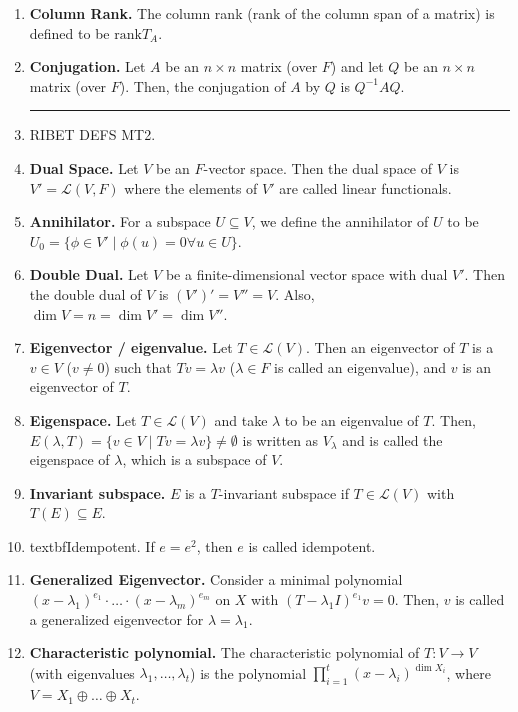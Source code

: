 \begin{enumerate}
	\item \textbf{Column Rank. } The column rank (rank of the column span of a matrix) is defined to be $\textrm{rank}T_A$. 
	\item \textbf{Conjugation. } Let $A$ be an $n \times n$ matrix (over $F$) and let $Q$ be an $n \times n$ matrix (over $F$). Then, the conjugation of $A$ by $Q$ is $Q^{-1}AQ$.
	\begin{center}
		\hrule
	\end{center}
	\item RIBET DEFS MT2.
	\item \textbf{Dual Space. } Let $V$ be an $F$-vector space. Then the dual space of $V$ is $V' = \mathscr{L}(V,F)$ where the elements of $V'$ are called linear functionals. 
	\item \textbf{Annihilator. } For a subspace $U \subseteq V$, we define the annihilator of $U$ to be $U_0 = \{\phi \in V' \mid \phi(u) = 0 \forall u \in U\}$. 
	\item \textbf{Double Dual. } Let $V$ be a finite-dimensional vector space with dual $V'$. Then the double dual of $V$ is $(V')' = V'' = V$. Also, $\dim V = n = \dim V' = \dim V''$. 
	\item \textbf{Eigenvector / eigenvalue. } Let $T \in \mathscr{L}(V)$. Then an eigenvector of $T$ is a $v \in V$ ($v \neq 0$) such that $Tv = \lambda v$ ($\lambda \in F$ is called an eigenvalue), and $v$ is an eigenvector of $T$. 
	\item \textbf{Eigenspace. } Let $T \in \mathscr{L}(V)$ and take $\lambda$ to be an eigenvalue of $T$. Then, $E(\lambda,T) = \{v \in V \mid Tv = \lambda v\} \neq \emptyset$ is written as $V_\lambda$ and is called the eigenspace of $\lambda$, which is a subspace of $V$. 
	\item \textbf{Invariant subspace. } $E$ is a $T$-invariant subspace if $T \in \mathscr{L}(V)$ with $T(E) \subseteq E$. 
	\item textbf{Idempotent. } If $e = e^2$, then $e$ is called idempotent. 
	\item \textbf{Generalized Eigenvector. } Consider a minimal polynomial $(x-\lambda_1)^{e_1} \cdot \dots \cdot (x-\lambda_m)^{e_m}$ on $X$ with $(T-\lambda_1I)^{e_1}v = 0$. Then, $v$ is called a generalized eigenvector for $\lambda = \lambda_1$. 
	\item \textbf{Characteristic polynomial. } The characteristic polynomial of $T: V \to V$ (with eigenvalues $\lambda_1,\dots,\lambda_t$) is the polynomial $\prod_{i=1}^{t} (x-\lambda_i)^{\dim X_i}$, where $V = X_1 \oplus \dots \oplus X_t$. 

\end{enumerate}
